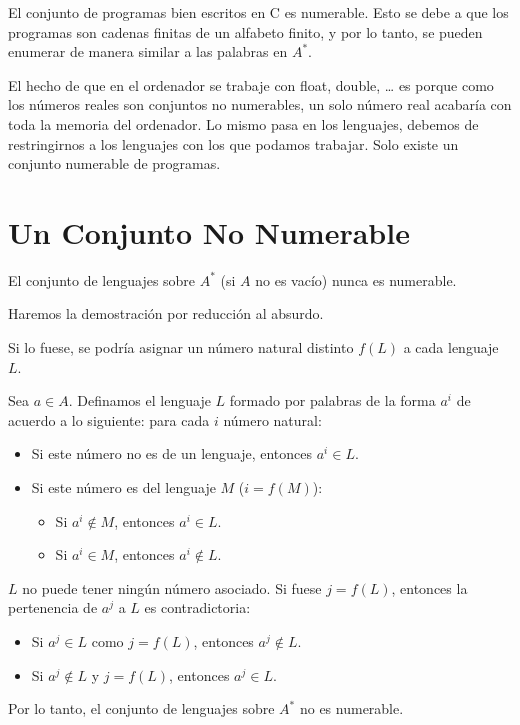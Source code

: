 \documentclass[12pt]{book} %
\begin{document}
\begin{ejemplo}
El conjunto de programas bien escritos en C es numerable. Esto se debe a que los programas son cadenas finitas de un alfabeto finito, y por lo tanto, se pueden enumerar de manera similar a las palabras en $A^*$.  
\end{ejemplo}

El hecho de que en el ordenador se trabaje con float, double, \ldots{}
es porque como los números reales son conjuntos no numerables, un solo
número real acabaría con toda la memoria del ordenador. Lo mismo pasa en
los lenguajes, debemos de restringirnos a los lenguajes con los que
podamos trabajar. Solo existe un conjunto numerable de programas.

\hypertarget{un-conjunto-no-numerable}{%
\section{Un Conjunto No Numerable}\label{un-conjunto-no-numerable}}

\begin{ejemplo}
El conjunto de lenguajes sobre $A^*$ (si $A$ no es vacío) nunca es numerable.  
\end{ejemplo}

Haremos la demostración por reducción al absurdo.\\

\begin{demostracion}
Si lo fuese, se podría asignar un número natural distinto $f(L)$ a cada lenguaje $L$.  

Sea $a \in A$.  
Definamos el lenguaje $L$ formado por palabras de la forma $a^i$ de acuerdo a lo siguiente: para cada $i$ número natural:  
\begin{itemize}
    \item Si este número no es de un lenguaje, entonces $a^i \in L$.  
    \item Si este número es del lenguaje $M$ ($i = f(M)$):  
        \begin{itemize}
            \item Si $a^i \notin M$, entonces $a^i \in L$.  
            \item Si $a^i \in M$, entonces $a^i \notin L$.  
        \end{itemize}
\end{itemize}

$L$ no puede tener ningún número asociado. Si fuese $j = f(L)$, entonces la pertenencia de $a^j$ a $L$ es contradictoria:  
\begin{itemize}
    \item Si $a^j \in L$ como $j = f(L)$, entonces $a^j \notin L$.  
    \item Si $a^j \notin L$ y $j = f(L)$, entonces $a^j \in L$.  
\end{itemize}

Por lo tanto, el conjunto de lenguajes sobre $A^*$ no es numerable.  
\end{demostracion}
\end{document}
